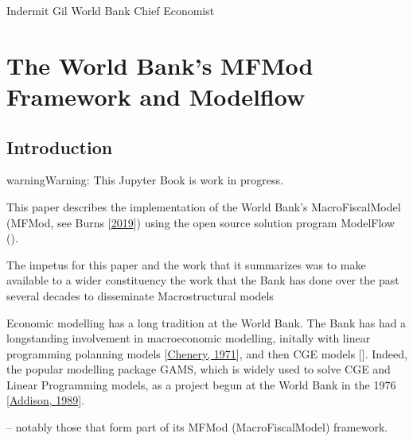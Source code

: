 \documentclass[letterpaper,10pt,english]{jupyterBook}
\begin{document}
\sphinxAtStartPar
Indermit Gil
World Bank Chief Economist

\sphinxstepscope


\part{The World Bank's MFMod Framework and Modelflow}

\sphinxstepscope


\chapter{Introduction}
\label{\detokenize{content/01_Introduction/Introduction:introduction}}\label{\detokenize{content/01_Introduction/Introduction::doc}}
\begin{sphinxadmonition}{warning}{Warning:}
\sphinxAtStartPar
This Jupyter Book is work in progress.
\end{sphinxadmonition}

\sphinxAtStartPar
This paper describes the implementation of the World Bank’s MacroFiscalModel (MFMod, see Burns  {[}\hyperlink{cite.content/99_BackMatter/References:id15}{2019}{]}) using the open source solution program ModelFlow ().

\sphinxAtStartPar
The impetus for this paper and the work that it summarizes was to make available to a wider constituency the work that the Bank has done over the past several decades to disseminate Macro\sphinxhyphen{}structural models%
\begin{footnote}[1]\sphinxAtStartFootnote
Economic modelling has a long tradition at the World Bank.  The Bank has had a long\sphinxhyphen{}standing involvement in macroeconomic modelling, initally with linear programming polanning models {[}\hyperlink{cite.content/99_BackMatter/References:id21}{Chenery, 1971}{]}, and then CGE models {[}{]}. Indeed, the popular modelling package GAMS, which is widely used to solve CGE and Linear Programming models,  as a project begun at the World Bank in the 1976 {[}\hyperlink{cite.content/99_BackMatter/References:id20}{Addison, 1989}{]}.
%
\end{footnote} – notably those that form part of its MFMod (MacroFiscalModel) framework.
\end{document}
